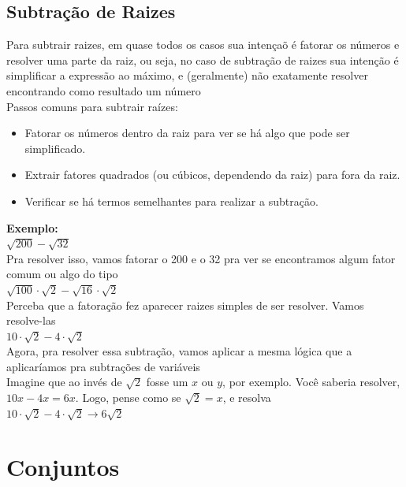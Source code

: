 \documentclass{article}
\begin{document}
\subsection{Subtração de Raizes}
Para subtrair raizes, em quase todos os casos sua intençaõ é fatorar os números e resolver uma parte da raiz, ou seja, no caso de subtração de raizes sua intenção é simplificar a expressão ao máximo, e (geralmente) não exatamente resolver encontrando como resultado um número
\\[10pt]
Passos comuns para subtrair raízes:
\begin{itemize}
    \item Fatorar os números dentro da raiz para ver se há algo que pode ser simplificado.
    \item Extrair fatores quadrados (ou cúbicos, dependendo da raiz) para fora da raiz.
    \item Verificar se há termos semelhantes para realizar a subtração.
\end{itemize}
\textbf{Exemplo:}
\\[10pt]
$\sqrt{200} - \sqrt{32}$
\\[5pt] Pra resolver isso, vamos fatorar o 200 e o 32 pra ver se encontramos algum fator comum ou algo do tipo
\\[5pt]
$\sqrt{100} \cdot \sqrt{2} - \sqrt{16} \cdot \sqrt{2}$
\\[5pt]
Perceba que a fatoração fez aparecer raizes simples de ser resolver. Vamos resolve-las
\\[5pt]
$10 \cdot \sqrt{2} - 4 \cdot \sqrt{2}$
\\[5pt]
Agora, pra resolver essa subtração, vamos aplicar a mesma lógica que a aplicaríamos pra subtrações de variáveis
\\[5pt]
Imagine que ao invés de $\sqrt{2}$ fosse um $x$ ou $y$, por exemplo. Você saberia resolver, $10x - 4x = 6x$. Logo, pense como se $\sqrt{2} = x$, e resolva
\\[5pt]
$10 \cdot \sqrt{2} - 4 \cdot \sqrt{2} \xrightarrow{} 6\sqrt{2}$

\section{Conjuntos}
\end{document}
